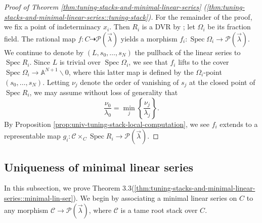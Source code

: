 \documentclass[a4paper,12pt]{amsart}
\theoremstyle{definition}
\newcommand{\bA}{\mathbb{A}}
\newcommand{\cC}{\mathcal{C}}
\newcommand{\Pcv}{\mathcal{P}(\vec{\lambda})}
\DeclareMathOperator{\Spec}{Spec}
\renewcommand{\setminus}{\smallsetminus}
\begin{document}
\begin{proof}[{Proof of Theorem \ref{thm:tuning-stacks-and-minimal-linear-series} (\ref{thm:tuning-stacks-and-minimal-linear-series::tuning-stack})}]
		For the remainder of the proof, we fix a point of indeterminacy $x_i$. Then $R_i$ is a DVR by \cite[\href{https://stacks.math.columbia.edu/tag/0AP3}{Tag 0AP3}]{Stacks}; let $\Omega_i$ be its fraction field. The rational map $f\colon C\dasharrow\Pcv$ yields a morphism $f_i\colon\Spec\Omega_i\to\Pcv$. We continue to denote by $(L,s_0,\dots,s_N)$ the pullback of the linear series to $\Spec R_i$. Since $L$ is trivial over $\Spec\Omega_i$, we see that $f_i$ lifts to the cover $\Spec\Omega_i\to\bA^{N+1}\setminus0$, where this latter map is defined by the $\Omega_i$-point $(s_0,\dots,s_N)$. Letting $\nu_j$ denote the order of vanishing of $s_j$ at the closed point of $\Spec R_i$, we may assume without loss of generality that
		\[
		\frac{\nu_0}{\lambda_0}=\min_j\left\{ \frac{\nu_j}{\lambda_j}\right\}.
		\]
		By Proposition \ref{prop:univ-tuning-stack-local-computation}, we see $f_i$ extends to a representable map $g_i\colon\cC\times_C\Spec R_i\to\Pcv$.
	\end{proof}
	
	
	\subsection{Uniqueness of minimal linear series}
	
	In this subsection, we prove Theorem 3.3(\ref{thm:tuning-stacks-and-minimal-linear-series::minimal-lin-ser}). We begin by associating a minimal linear series on $C$ to any morphism $\cC\to\Pcv$, where $\cC$ is a tame root stack over $C$.
	
\end{document}
